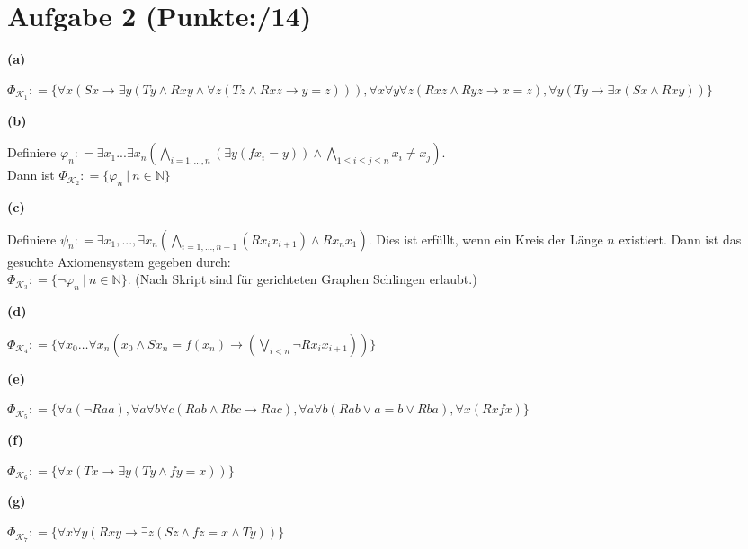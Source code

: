 \documentclass[11pt, a4paper]{article}
\newcommand{\p}{14}
\newcommand{\defgr}{\mathrel{\mathop:\!\!=}}
\begin{document}
\section*{Aufgabe 2 (Punkte:\qquad/\p)}
\textbf{(a)}
\begin{adjustwidth}{20pt}{20pt}
	$\Phi_{\mathcal{K}_1} \defgr \{\forall x(Sx \rightarrow \exists y(Ty \wedge Rxy \wedge \forall z(Tz \wedge Rxz \rightarrow y=z))),
	\forall x\forall y\forall z(Rxz \wedge Ryz \rightarrow x=z), \forall y(Ty \rightarrow \exists x(Sx \wedge Rxy))\}$
\end{adjustwidth}
\textbf{(b)}
\begin{adjustwidth}{20pt}{20pt}
	Definiere $\varphi_n \defgr \exists x_1...\exists x_n\left(\bigwedge_{i=1,...,n}(\exists y(fx_i = y)) \wedge \bigwedge_{1\leq i \leq j \leq n}x_i \neq x_j\right)$.\\ Dann ist
	$\Phi_{\mathcal{K}_2} \defgr \{ \varphi_n\ |\ n \in \mathbb{N}\}$
\end{adjustwidth}
\textbf{(c)}
\begin{adjustwidth}{20pt}{20pt}
	Definiere $\psi_n \defgr \exists x_1,...,\exists x_n(\bigwedge_{i=1,...,n-1}(Rx_ix_{i+1}) \wedge Rx_nx_1)$. Dies ist erfüllt, wenn ein Kreis der Länge $n$ existiert.
	Dann ist das gesuchte Axiomensystem gegeben durch:\\
	$\Phi_{\mathcal{K}_3} \defgr \{ \neg\varphi_n\ |\ n \in \mathbb{N}\}$. (Nach Skript sind für gerichteten Graphen Schlingen erlaubt.)
\end{adjustwidth}
\textbf{(d)}
\begin{adjustwidth}{20pt}{20pt}
	$\Phi_{\mathcal{K}_4} \defgr \{ \forall x_0 \dotsc \forall x_n \left ( x_0 \wedge Sx_n = f(x_n) \rightarrow \left(\bigvee\limits_{i < n} \neg Rx_ix_{i+1} \right) \right ) \}$
\end{adjustwidth}
\textbf{(e)}
\begin{adjustwidth}{20pt}{20pt}
	$\Phi_{\mathcal{K}_5} \defgr \{\forall a(\neg Raa), \forall a\forall b \forall c(Rab \wedge Rbc \rightarrow Rac), \forall a \forall b(Rab \vee a=b \vee Rba), \forall x(Rxfx)\}$
\end{adjustwidth}
\textbf{(f)}
\begin{adjustwidth}{20pt}{20pt}
	$\Phi_{\mathcal{K}_6} \defgr \{ \forall x (Tx \rightarrow \exists y (Ty \wedge fy=x))\}$
\end{adjustwidth}
\textbf{(g)}
\begin{adjustwidth}{20pt}{20pt}
	$\Phi_{\mathcal{K}_7} \defgr \{ \forall x \forall y (Rxy \rightarrow \exists z (Sz \wedge fz=x \wedge Ty))\}$
\end{adjustwidth}
\end{document}
